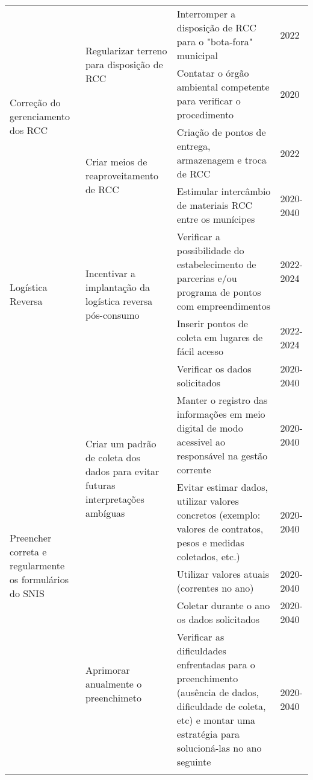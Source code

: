 \begin{center}
\begin{longtable}{|p{}|p{}|p{}|p{}|}
		\midrule
		\multirow{4}[8]{*}{Correção do gerenciamento dos RCC} & \multirow{2}[4]{*}{Regularizar terreno para disposição de RCC} & Interromper a disposição de RCC para o "bota-fora" municipal & 2022 \\
		\cmidrule{3-4}          &       & Contatar o órgão ambiental competente para verificar o procedimento & 2020 \\
		\cmidrule{2-4}          & \multirow{2}[4]{*}{Criar meios de reaproveitamento de RCC} & Criação de pontos de entrega, armazenagem e troca de RCC & 2022 \\
		\cmidrule{3-4}          &       & Estimular intercâmbio de materiais RCC entre os munícipes & 2020-2040 \\
		\midrule
		\multirow{2}[4]{*}{Logística Reversa} & \multirow{2}[4]{*}{Incentivar a implantação da logística reversa pós-consumo} & Verificar a possibilidade do estabelecimento de parcerias e/ou programa de pontos com empreendimentos & 2022-2024 \\
		\cmidrule{3-4}          &       & Inserir pontos de coleta em lugares de fácil acesso & 2022-2024 \\
		\midrule
		\multirow{6}[12]{*}{Preencher correta e regularmente os formulários do SNIS} & \multirow{4}[8]{*}{Criar um padrão de coleta dos dados para evitar futuras interpretações ambíguas} & Verificar os dados solicitados & 2020-2040 \\
		\cmidrule{3-4}          &       & Manter o registro das informações em meio digital de modo acessivel ao responsável na gestão corrente & 2020-2040 \\
		\cmidrule{3-4}          &       & Evitar estimar dados, utilizar valores concretos (exemplo: valores de contratos, pesos e medidas coletados, etc.) & 2020-2040 \\
		\cmidrule{3-4}          &       & Utilizar valores atuais (correntes no ano) & 2020-2040 \\
		\cmidrule{2-4}          & \multirow{2}[4]{*}{Aprimorar anualmente o preenchimeto} & Coletar durante o ano os dados solicitados & 2020-2040 \\
		\cmidrule{3-4}          &       & Verificar as dificuldades enfrentadas para o preenchimento (ausência de dados, dificuldade de coleta, etc) e montar uma estratégia para solucioná-las no ano seguinte & 2020-2040 \\
		\bottomrule
	\label{tab:addlabel}%
\end{longtable}%
\end{center}